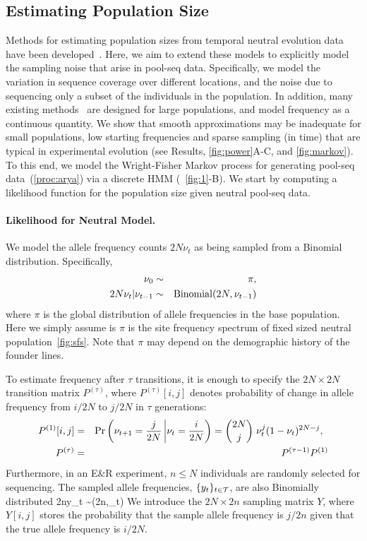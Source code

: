 \subsection{Estimating Population Size}
Methods for estimating population sizes from temporal neutral
evolution data have been
developed~\cite{williamson1999using,anderson2000monte,
  bollback2008estimation, Terhorst2015Multi,jonas2016estimating}.
Here, we aim to extend these models to explicitly model the sampling
noise that arise in pool-seq data. Specifically, we model the
variation in sequence coverage over different locations, and the noise
due to sequencing only a subset of the individuals in the population.
In addition, many existing
methods~\cite{bollback2008estimation,feder2014Identifying,topa2015gaussian,Terhorst2015Multi}
are designed for large populations, and model frequency as a
continuous quantity. We show that smooth approximations may be
inadequate for small populations, low starting frequencies and sparse
sampling (in time) that are typical in experimental evolution (see
Results, \ref{fig:power}A-C, and \ref{fig:markov}). To this end, we
model the Wright-Fisher Markov process for generating pool-seq
data~(\ref{proc:arya}) via a {discrete} HMM (~\ref{fig:1}-B). We start
by computing a likelihood function for the population size given
neutral pool-seq data.


\paragraph{Likelihood for Neutral Model.}
We model the allele frequency counts $2N\nu_t$ as being sampled from a
Binomial distribution. Specifically,
\begin{eqnarray*} 
  \nu_0 &\sim& \pi,\\
  2N\nu_t|\nu_{t-1} &\sim& \operatorname{Binomial}(2N,\nu_{t-1}) 
\end{eqnarray*}
where $\pi$ is the global distribution of allele frequencies in the
base population. Here we simply assume is $\pi$ is the site frequency
spectrum of fixed sized neutral population~\ref{fig:sfs}. Note that $\pi$ may 
depend on the
demographic history of the founder lines.

To estimate frequency after $\tau$ transitions, it is enough to
specify the $2N\times2N$ transition matrix $P^{(\tau)}$, where
$P^{(\tau)}[i,j]$ denotes probability of change in allele frequency
from ${i}/{2N}$ to ${j}/{2N}$ in $\tau$ generations:
\begin{eqnarray}
  P^{(1)}[i,j] &=& \operatorname{Pr}\left(\nu_{t+1}=\frac{j}{2N} \left|
      \nu_{t}=\frac{i}{2N}\right)={2N \choose j} \right.  \nu_{t}^j
  (1-\nu_{t})^{2N-j}, \;\;\label{eq:P1}\\
  P^{(\tau)} &=&   P^{(\tau-1)}P^{(1)} \label{eq:Pt}
\end{eqnarray}
Furthermore, in an E\&R experiment, $n\le N$ individuals are randomly
selected for sequencing. The {sampled allele frequencies},
$\{y_{t}\}_{t\in{\cal T}}$, are also Binomially distributed \beq 2ny_{t}
\sim {}(2n,\nu_t) \eeq We introduce the $2N\times2n$
sampling matrix $Y$, where $Y[i,j]$ stores the probability that the
sample allele frequency is ${j}/{2n}$ given that the true allele
frequency is ${i}/{2N}$.

